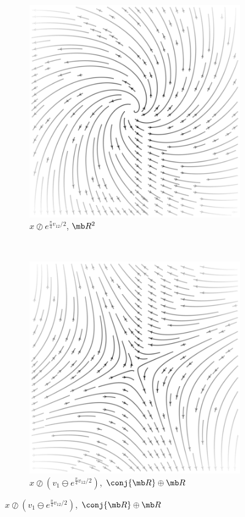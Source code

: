 \documentclass{juliacon}
\begin{document}
\begin{figure}[ht]
	\begin{subfigure}[b]{0.23\textwidth}
		\includegraphics[width=\textwidth]{img/plane-3.png}
		\caption{$x\oslash e^{\frac\pi4 v_{12}/2}$, $\mb R^2$}
	\end{subfigure}
	~
	\begin{subfigure}[b]{0.23\textwidth}
		\includegraphics[width=\textwidth]{img/plane-4.png}
		\caption{$x\oslash(v_1\ominus e^{\frac\pi4 v_{12}/2})$, $\conj{\mb R}\oplus\mb R$}
	\end{subfigure}


\end{figure}
\end{document}
